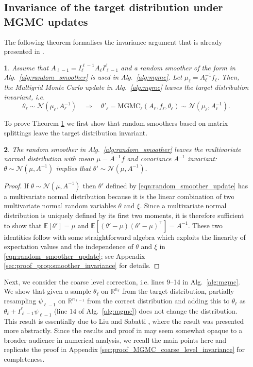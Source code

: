 \documentclass[11pt,english]{article}
\theoremstyle{plain}
\newtheorem{thm}{\protect\theoremname}[section]
\theoremstyle{plain}
\newtheorem{prop}[thm]{\protect\propositionname}
\theoremstyle{plain}
\theoremstyle{plain}
\numberwithin{equation}{section}
\providecommand{\propositionname}{Proposition}
\providecommand{\theoremname}{Theorem}
\begin{document}
\subsection{Invariance of the target distribution under MGMC updates}\label{sec:theory_invariance}
The following theorem formalises the invariance argument that is already presented in \cite{goodman1989multigrid}.
\begin{thm}\label{thm:mgmc_invariance}
	Assume that $A_{\ell-1} = I_\ell^{\ell-1} A_\ell I_{\ell-1}^\ell$ and a random smoother of the form in Alg.~\ref{alg:random_smoother} is used in Alg.~\ref{alg:mgmc}. Let $\mu_\ell = A_\ell^{-1}f_\ell$. Then, the Multigrid Monte Carlo update in Alg.~\ref{alg:mgmc} leaves the target distribution invariant, i.e.
	\begin{equation}
		\theta_\ell \sim \mathcal{N}(\mu_\ell,A_\ell^{-1})  \quad \Rightarrow \quad
		\theta'_\ell = \mathrm{MGMC}_{\ell}(A_\ell,f_\ell,\theta_\ell) \sim \mathcal{N}(\mu_\ell,A_\ell^{-1}).
		\label{eqn:mgmc_invariance}
	\end{equation}
\end{thm}
To prove Theorem \ref{thm:mgmc_invariance} we first show that random smoothers based on matrix splittings leave the target distribution invariant.
\begin{prop}\label{prop:smoother_invariance}
	The random smoother in Alg.~\ref{alg:random_smoother} leaves the multivariate normal distribution with mean $\mu=A^{-1}f$ and covariance $A^{-1}$ invariant: $\theta \sim \mathcal{N}(\mu,A^{-1})$ implies that $\theta' \sim \mathcal{N}(\mu,A^{-1})$.
\end{prop}
\begin{proof}
	If $\theta\sim \mathcal{N}(\mu,A^{-1})$ then $\theta'$ defined by \eqref{eqn:random_smoother_update} has a multivariate normal distribution because it is the linear combination of two multivariate normal random variables $\theta$ and $\xi$. Since a multivariate normal distribution is uniquely defined by its first two moments, it is therefore sufficient to show that $\mathbb{E}[\theta']=\mu$ and $\mathbb{E}[(\theta'-\mu)(\theta'-\mu)^\top]=A^{-1}$. These two identities follow with some straightforward algebra which exploits the linearity of expectation values and the independence of $\theta$ and $\xi$ in \eqref{eqn:random_smoother_update}; see Appendix \ref{sec:proof_prop:smoother_invariance} for details.
\end{proof}
Next, we consider the coarse level correction, i.e. lines 9--14 in Alg.~\ref{alg:mgmc}. We show that given a sample $\theta_{\ell}$ on $\mathbb{R}^{n_{\ell}}$ from the target distribution, partially resampling $\psi_{\ell-1}$ on $\mathbb{R}^{n_{\ell-1}}$ from the correct distribution and adding this to $\theta_{\ell}$ as $\theta_{\ell}+I_{\ell-1}^{\ell}\psi_{\ell-1}$ (line 14 of Alg.~\ref{alg:mgmc}) does not change the distribution. This result is essentially due to Liu and Sabatti \cite[Theorem 3]{Liu.J.S_Sabatti_2000_generalised}, where the result was presented more abstractly. Since the results and proof in \cite{Liu.J.S_Sabatti_2000_generalised} may seem somewhat opaque to a broader audience in numerical analysis, we recall the main points here and replicate the proof in Appendix \ref{sec:proof_MGMC_coarse_level_invariance} for completeness.
\end{document}
